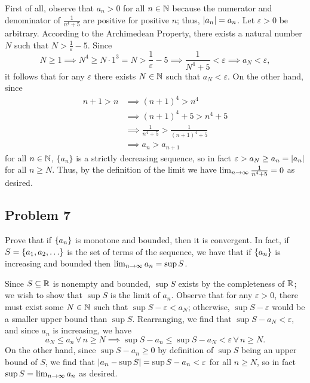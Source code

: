 \documentclass[main.tex]{subfiles}
\begin{document}
\begin{soln}
    First of all, observe that $a_n > 0$ for all $n\in \mathbb N$ because the numerator and denominator of $\frac{1}{n^4 + 5}$ are positive for positive $n$; thus, $\left\lvert a_n \right\rvert = a_n$. Let $\varepsilon > 0$ be arbitrary. According to the Archimedean Property, there exists a natural number $N$ such that $N > \frac{1}{\varepsilon} - 5$. Since
    \[N \ge 1\implies N^4 \ge N \cdot 1^3 = N > \frac{1}{\varepsilon} - 5\implies \frac{1}{N^4 + 5} < \varepsilon\implies a_N < \varepsilon,\]
    it follows that for any $\varepsilon$ there exists $N\in \mathbb N$ such that $a_N < \varepsilon$. On the other hand, since
    \begin{align*}
        n + 1 > n &\implies (n + 1)^4 > n^4 \\
        &\implies (n + 1)^4 + 5 > n^4 + 5 \\
        &\implies \frac{1}{n^4 + 5} > \frac{1}{(n + 1)^4 + 5} \\
        &\implies a_n > a_{n + 1}
    \end{align*}
    for all $n\in \mathbb N$, $\{a_n\}$ is a strictly decreasing sequence, so in fact $\varepsilon > a_N \ge a_n = \left\lvert a_n \right\rvert$ for all $n\ge N$. Thus, by the definition of the limit we have $\lim_{n\to \infty}\frac{1}{n^4 + 5} = 0$ as desired.
\end{soln}
\eject

\subsection{Problem 7}
\begin{claim}
    Prove that if $\left\{ a_n \right\}$ is monotone and bounded, then it is convergent. In fact, if $S = \left\{ a_1, a_2, \ldots  \right\}$ is the set of terms of the sequence, we have that if $\left\{ a_n \right\}$ is increasing and bounded then $\lim_{n\to \infty} a_n = \sup S$.
\end{claim}

\begin{soln}
    Since $S\subseteq \mathbb R$ is nonempty and bounded, $\sup S$ exists by the completeness of $\mathbb R$; we wish to show that $\sup S$ is the limit of $a_n$. Observe that for any $\varepsilon > 0$, there must exist some $N\in \mathbb N$ such that $\sup S - \varepsilon < a_N$; otherwise, $\sup S - \varepsilon$ would be a smaller upper bound than $\sup S$. Rearranging, we find that $\sup S - a_N < \varepsilon$, and since $a_n$ is increasing, we have 
    \[a_N \le a_n\,\forall\, n \ge N\implies \sup S - a_n \le \sup S - a_N < \varepsilon\,\forall\,n\ge N.\]
    On the other hand, since $\sup S - a_n \ge 0$ by definition of $\sup S$ being an upper bound of $S$, we find that $\left\lvert a_n - \sup S \right\rvert = \sup S - a_n < \varepsilon$ for all $n\ge N$, so in fact $\sup S = \lim_{n\to \infty} a_n$ as desired.
\end{soln}
\eject
\end{document}
